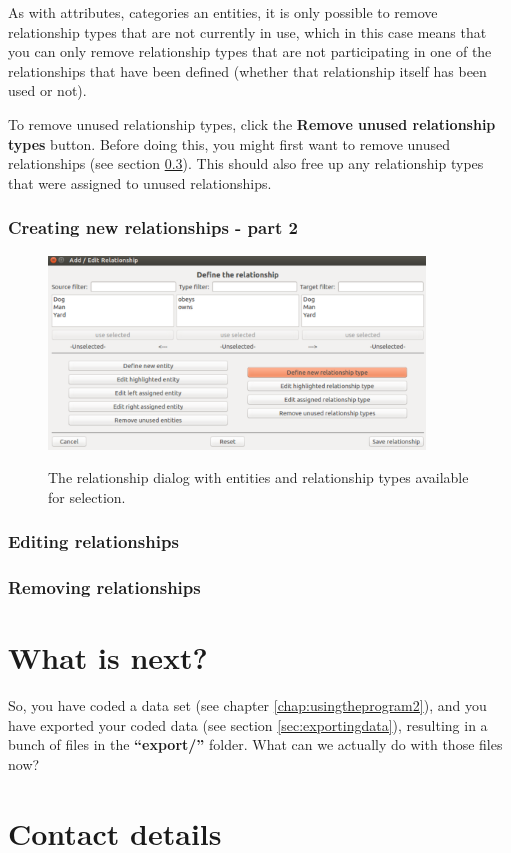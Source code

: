 \documentclass{memoir}
\begin{document}
As with attributes, categories an entities, it is only possible to remove relationship types that are not currently in use, which in this case means that you can only remove relationship types that are not participating in one of the relationships that have been defined (whether that relationship itself has been used or not).

To remove unused relationship types, click the \textbf{Remove unused relationship types} button. Before doing this, you might first want to remove unused relationships (see section \ref{sec:removingrelationships}). This should also free up any relationship types that were assigned to unused relationships.

\subsection{Creating new relationships - part 2}
\label{sec:creatingnewrelationships2}

\begin{figure}[h!]
  \centering
  \caption{The relationship dialog with entities and relationship types available for selection.}
  \includegraphics[width=100mm]{Screenshot_18.pdf}
  \label{fig:relationshipdialog2}
\end{figure}

\subsection{Editing relationships}
\label{sec:editingrelationships}



\subsection{Removing relationships}
\label{sec:removingrelationships}


\chapter{What is next?}
\label{chap:whatisnext}

So, you have coded a data set (see chapter \ref{chap:usingtheprogram2}), and you have exported your coded data (see section \ref{sec:exportingdata}), resulting in a bunch of files in the \textbf{``export/''} folder. What can we actually do with those files now? 


\chapter{Contact details}
\label{chap:contactdetails}
\end{document}
